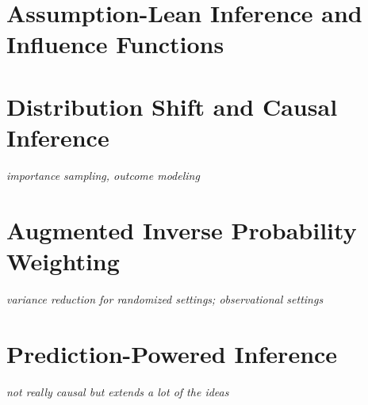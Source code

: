 \documentclass[../../../main.tex]{subfiles}
\begin{document}
\section{Assumption-Lean Inference and Influence Functions}

\section{Distribution Shift and Causal Inference}
\textit{importance sampling, outcome modeling}

\section{Augmented Inverse Probability Weighting}
\textit{variance reduction for randomized settings; observational settings}

\section{Prediction-Powered Inference}
\textit{not really causal but extends a lot of the ideas}

\printbibliography[
    heading=subbibintoc,
    title={References}
]
\end{document}
